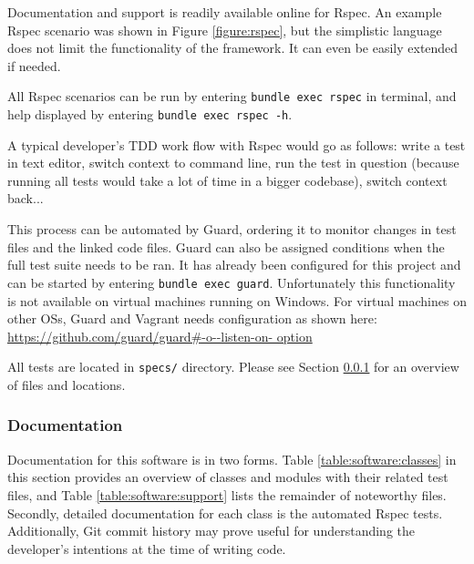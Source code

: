 Documentation and support is readily available online for Rspec. An example
Rspec scenario was shown in Figure \ref{figure:rspec}, but the simplistic
language does not limit the functionality of the framework. It can even be
easily extended if needed.

All Rspec scenarios can be run by entering \texttt{bundle exec rspec} in
terminal, and help displayed by entering \texttt{bundle exec rspec -h}.

A typical developer's TDD work flow with Rspec would go as follows: write a test
in text editor, switch context to command line, run the test in question
(because running all tests would take a lot of time in a bigger codebase),
switch context back...

This process can be automated by Guard, ordering it to monitor changes in test
files and the linked code files. Guard can also be assigned conditions when the
full test suite needs to be ran. It has already been configured for this
project and can be started by entering \texttt{bundle exec guard}.
Unfortunately this functionality is not available on virtual machines running
on Windows. For virtual machines on other OSs, Guard and Vagrant needs
configuration as shown here: \url{https://github.com/guard/guard#-o--listen-on-
option}

All tests are located in \texttt{specs/} directory. Please see Section
\ref{sec:maintenance_manual:documentation} for an overview of files and
locations.


\subsubsection{Documentation}
\label{sec:maintenance_manual:documentation}

Documentation for this software is in two forms. Table
\ref{table:software:classes} in this section provides an overview of classes
and modules with their related test files, and Table
\ref{table:software:support} lists the remainder of noteworthy files. Secondly,
detailed documentation for each class is the automated Rspec tests.
Additionally, Git commit history may prove useful for understanding the
developer's intentions at the time of writing code.

